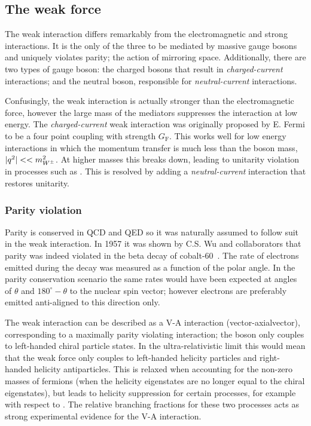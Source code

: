 \subsection{The weak force}

The weak interaction differs remarkably from the electromagnetic and strong interactions. It is the only of the three to be mediated by massive gauge bosons and uniquely violates parity; the action of mirroring space. 
Additionally, there are two types of gauge boson: the charged \Wpm bosons that result in \emph{charged-current} interactions; and the neutral \Z boson, responsible for \emph{neutral-current} interactions. 

Confusingly, the weak interaction is actually stronger than the electromagnetic force, however the large mass of the mediators suppresses the interaction at low energy.
The \emph{charged-current} weak interaction was originally proposed by E. Fermi to be a four point coupling with strength $G_{\text{F}}$. 
This works well for low energy interactions in which the momentum transfer is much less than the \Wpm boson mass, $|q^{2}|<<m_{W^\pm}^2$. At higher masses this breaks down, leading to unitarity violation in processes such as \decay{\ep\en}{\Wp\Wm}. This is resolved by adding a \emph{neutral-current} interaction that restores unitarity. 


\subsubsection{Parity violation}
Parity is conserved in QCD and QED so it was naturally assumed to follow suit in the weak interaction. In 1957 it was shown by C.S. Wu and collaborators that parity was indeed violated in the beta decay of cobalt-60~\cite{PhysRev.105.1413}. The rate of electrons emitted during the decay was measured as a function of the polar angle. In the parity conservation scenario the same rates would have been expected at angles of $\theta$ and $180^\circ-\theta$ to the nuclear spin vector; however electrons are preferably emitted anti-aligned to this direction only.          

The weak interaction can be described as a V-A interaction (vector-axialvector), corresponding to a maximally parity violating interaction; the \Wpm boson only couples to left-handed chiral particle states. In the ultra-relativistic limit this would mean that the weak force only couples to left-handed helicity particles and right-handed helicity antiparticles. This is relaxed when accounting for the non-zero masses of fermions (when the helicity eigenstates are no longer equal to the chiral eigenstates), but leads to helicity suppression for certain processes, for example \decay{\pim}{\en\neueb} with respect to \decay{\pim}{\mun\neumb}. The relative branching fractions for these two processes acts as strong experimental evidence for the V-A interaction.

